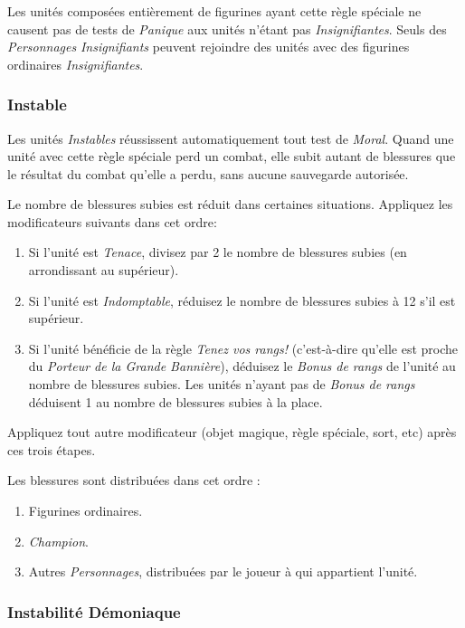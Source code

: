 \subsubsection*{}

Les unités composées entièrement de figurines ayant cette règle spéciale ne causent pas de tests de \emph{Panique} aux unités n'étant pas \emph{Insignifiantes}. Seuls des \emph{Personnages} \emph{Insignifiants} peuvent rejoindre des unités avec des figurines ordinaires \emph{Insignifiantes}.

\subsubsection*{Instable}

Les unités \emph{Instables} réussissent automatiquement tout test de \emph{Moral}. Quand une unité avec cette règle spéciale perd un combat, elle subit autant de blessures que le résultat du combat qu'elle a perdu, sans aucune sauvegarde autorisée.

Le nombre de blessures subies est réduit dans certaines situations. Appliquez les modificateurs suivants dans cet ordre:
\begin{enumerate}
\item Si l'unité est \emph{Tenace}, divisez par 2 le nombre de blessures subies (en arrondissant au supérieur).
\item Si l'unité est \emph{Indomptable}, réduisez le nombre de blessures subies à 12 s'il est supérieur.
\item Si l'unité bénéficie de la règle \emph{Tenez vos rangs!} (c'est-à-dire qu'elle est proche du \emph{Porteur de la Grande Bannière}), déduisez le \emph{Bonus de rangs} de l'unité au nombre de blessures subies. Les unités n'ayant pas de \emph{Bonus de rangs} déduisent 1 au nombre de blessures subies à la place.
\end{enumerate}
Appliquez tout autre modificateur (objet magique, règle spéciale, sort, etc) après ces trois étapes.

Les blessures sont distribuées dans cet ordre :
\begin{enumerate}
\item Figurines ordinaires.
\item \emph{Champion}.
\item Autres \emph{Personnages}, distribuées par le joueur à qui appartient l'unité.
\end{enumerate}

\subsubsection*{Instabilité Démoniaque}

